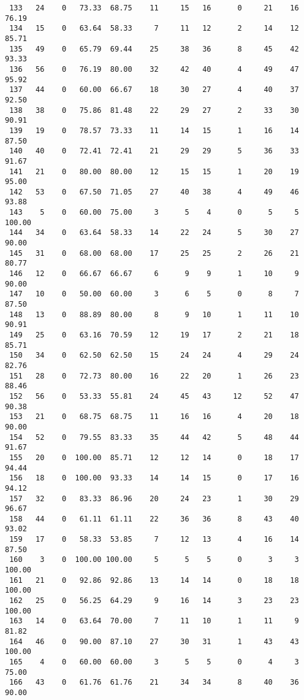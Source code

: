 \begin{verbatim}
 133   24    0   73.33  68.75    11     15   16      0     21    16    76.19
 134   15    0   63.64  58.33     7     11   12      2     14    12    85.71
 135   49    0   65.79  69.44    25     38   36      8     45    42    93.33
 136   56    0   76.19  80.00    32     42   40      4     49    47    95.92
 137   44    0   60.00  66.67    18     30   27      4     40    37    92.50
 138   38    0   75.86  81.48    22     29   27      2     33    30    90.91
 139   19    0   78.57  73.33    11     14   15      1     16    14    87.50
 140   40    0   72.41  72.41    21     29   29      5     36    33    91.67
 141   21    0   80.00  80.00    12     15   15      1     20    19    95.00
 142   53    0   67.50  71.05    27     40   38      4     49    46    93.88
 143    5    0   60.00  75.00     3      5    4      0      5     5   100.00
 144   34    0   63.64  58.33    14     22   24      5     30    27    90.00
 145   31    0   68.00  68.00    17     25   25      2     26    21    80.77
 146   12    0   66.67  66.67     6      9    9      1     10     9    90.00
 147   10    0   50.00  60.00     3      6    5      0      8     7    87.50
 148   13    0   88.89  80.00     8      9   10      1     11    10    90.91
 149   25    0   63.16  70.59    12     19   17      2     21    18    85.71
 150   34    0   62.50  62.50    15     24   24      4     29    24    82.76
 151   28    0   72.73  80.00    16     22   20      1     26    23    88.46
 152   56    0   53.33  55.81    24     45   43     12     52    47    90.38
 153   21    0   68.75  68.75    11     16   16      4     20    18    90.00
 154   52    0   79.55  83.33    35     44   42      5     48    44    91.67
 155   20    0  100.00  85.71    12     12   14      0     18    17    94.44
 156   18    0  100.00  93.33    14     14   15      0     17    16    94.12
 157   32    0   83.33  86.96    20     24   23      1     30    29    96.67
 158   44    0   61.11  61.11    22     36   36      8     43    40    93.02
 159   17    0   58.33  53.85     7     12   13      4     16    14    87.50
 160    3    0  100.00 100.00     5      5    5      0      3     3   100.00
 161   21    0   92.86  92.86    13     14   14      0     18    18   100.00
 162   25    0   56.25  64.29     9     16   14      3     23    23   100.00
 163   14    0   63.64  70.00     7     11   10      1     11     9    81.82
 164   46    0   90.00  87.10    27     30   31      1     43    43   100.00
 165    4    0   60.00  60.00     3      5    5      0      4     3    75.00
 166   43    0   61.76  61.76    21     34   34      8     40    36    90.00

\end{verbatim}
